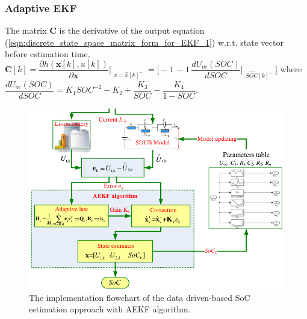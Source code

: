 \documentclass{beamer}
\begin{document}
\begin{frame}
	
	\frametitle{Adaptive EKF}
	
	The matrix $\bm{C}$ is the derivative of the output equation (\ref{eqn:discrete_state_space_matrix_form_for_EKF_1}) w.r.t. state vector before estimation time, $\bm{C}[k]= \dfrac{\partial h(\bm{x}[k],u[k])}{\partial \bm{x}}\Biggr|_{\substack{x=\hat{x}[k]^{-}}} = \bigg[-1\,-1\,\dfrac{dU_{oc}(SOC)}{dSOC}\Bigr|_{\substack{\hat{SOC}[k]^{-}}}\bigg]$ where $\dfrac{dU_{oc}(SOC)}{dSOC} = K_{1}SOC^{-2}-K_{2}+ \dfrac{K_{3}}{SOC}-\dfrac{K_{4}}{1-SOC}$.
	
	\vspace{-2mm}
	
	\begin{figure}
		\centering
		\includegraphics[height=0.45\textwidth, keepaspectratio]{images/Data_Driven_SoC_Estimation_Approach_With_AEKF_Algorithm.pdf}
		\caption{The implementation flowchart of the data driven-based SoC estimation approach with AEKF algorithm. }
		\label{fig:AEKF_Algorithm_Flowchart}
	\end{figure}
	
\end{frame}
\end{document}
